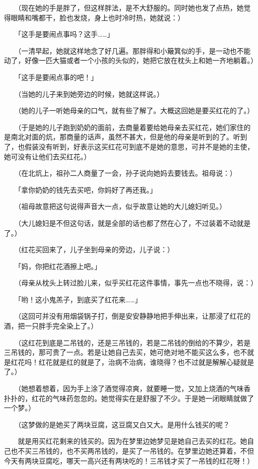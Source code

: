 \documentclass[UTF8]{ctexart}
\begin{document}
　　（现在她的手是胖了，但这样胖法，是不大舒服的。同时她也发了点热，她觉得眼睛和嘴都干，脸也发烧，身上也时冷时热，她就说：）

　　「这手是要闹点事吗？这手……」

　　（一清早起，她就这样地念了好几遍。那胖得和小簸箕似的手，是一动也不能动了，好像一匹大猫或者一个小孩的头似的，她把它放在枕头上和她一齐地躺着。）

　　「这手是要闹点事的吧！」

　　（当她的儿子来到她旁边的时候，她就这样说。）

　　（她的儿子一听她母亲的口气，就有些了解了。大概这回她是要买红花的了。）

　　（于是她的儿子跑到奶奶的面前，去商量着要给她母亲去买红花，她们家住的是南北对面的炕，那商量的话声，虽然不甚大，但是他的母亲是听到的了。听到了，也假装没有听到，好表示这买红花可到底不是她的意思，可并不是她的主使，她可没有让他们去买红花。）

　　（在北炕上，祖孙二人商量了一会，孙子说向她妈去要钱去。祖母说：）

　　「拿你奶奶的钱先去买吧，你妈好了再还我。」

　　（祖母故意把这句说得声音大一点，似乎故意让她的大儿媳妇听见。）

　　（大儿媳妇是不但这句话，就是全部的话也都了然在心了，不过装着不动就是了。）

　　（红花买回来了，儿子坐到母亲的旁边，儿子说：）

　　「妈，你把红花酒擦上吧。」

　　（母亲从枕头上转过脸儿来，似乎买红花这件事情，事先一点也不晓得，说：）

　　「哟！这小鬼羔子，到底买了红花来……」

　　（这回可并没有用烟袋锅子打，倒是安安静静地把手伸出来，让那浸了红花的酒，把一只胖手完全染上了。）

　　（这红花到底是二吊钱的，还是三吊钱的，若是二吊钱的倒给的不算少，若是三吊钱的，那可贵了一点。若是让她自己去买，她可绝对地不能买这么多，也不就是红花吗！红花就是红的就是了，治病不治病，谁晓得？也不过就是解解心疑就是了。）

　　（她想着想着，因为手上涂了酒觉得凉爽，就要睡一觉，又加上烧酒的气味香扑扑的，红花的气味药忽忽的。她觉得实在是舒服了不少。于是她一闭眼睛就做了一个梦。）

　　（这梦做的是她买了两块豆腐，这豆腐又白又大。是用什么钱买的呢？

　　就是用买红花剩来的钱买的。因为在梦里边她梦见是她自己去买的红花。她自己也不买三吊钱的，也不买两吊钱的，是买了一吊钱的。在梦里边她还算着，不但今天有两块豆腐吃，哪天一高兴还有两块吃的！三吊钱才买了一吊钱的红花呀！）
\end{document}
